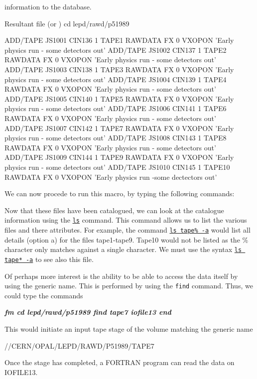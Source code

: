 information to the database.
\begin{XMPt}{Resultant file  (or )}
cd lepd/rawd/p51989

ADD/TAPE JS1001 CIN136 1 TAPE1 RAWDATA FX 0 VXOPON 'Early physics run - some detectors out'
ADD/TAPE JS1002 CIN137 1 TAPE2 RAWDATA FX 0 VXOPON 'Early physics run - some detectors out'
ADD/TAPE JS1003 CIN138 1 TAPE3 RAWDATA FX 0 VXOPON 'Early physics run - some detectors out'
ADD/TAPE JS1004 CIN139 1 TAPE4 RAWDATA FX 0 VXOPON 'Early physics run - some detectors out'
ADD/TAPE JS1005 CIN140 1 TAPE5 RAWDATA FX 0 VXOPON 'Early physics run - some detectors out'
ADD/TAPE JS1006 CIN141 1 TAPE6 RAWDATA FX 0 VXOPON 'Early physics run - some detectors out'
ADD/TAPE JS1007 CIN142 1 TAPE7 RAWDATA FX 0 VXOPON 'Early physics run - some detectors out'
ADD/TAPE JS1008 CIN143 1 TAPE8 RAWDATA FX 0 VXOPON 'Early physics run - some detectors out'
ADD/TAPE JS1009 CIN144 1 TAPE9 RAWDATA FX 0 VXOPON 'Early physics run - some detectors out'
ADD/TAPE JS1010 CIN145 1 TAPE10 RAWDATA FX 0 VXOPON 'Early physics run -some dectectors out'
\end{XMPt}
We can now procede to run this macro, by typing the following commands:
\begin{XMP}
\end{XMP}
Now that these files have been catalogued, we can look at the catalogue
information using the {\tt\underline{ls}} command.
This command allows
us to list the various files and there attributes. For example, the
command {\tt\underline{ls tape\% -a}}
would list all details (option a)
for the files tape1-tape9. Tape10 would not be listed as the \% character
only matches against a single character. We must use the syntax
{\tt\underline{ls tape* -a}} to see also this file.
\par
Of perhaps more interest is the ability to be able to access the data
itself by using the generic name. This is performed by using the
{\tt find} command. Thus, we could type the commands
\begin{XMP}
{\bf\it
fm
cd lepd/rawd/p51989
find tape7 iofile13
end
}
\end{XMP}
\par
This would initiate an input tape stage of the volume matching the 
generic name
\begin{XMP}
//CERN/OPAL/LEPD/RAWD/P51989/TAPE7
\end{XMP}
\par
Once the stage has completed, a FORTRAN
program can read the data on {\ttsc IOFILE13}.
